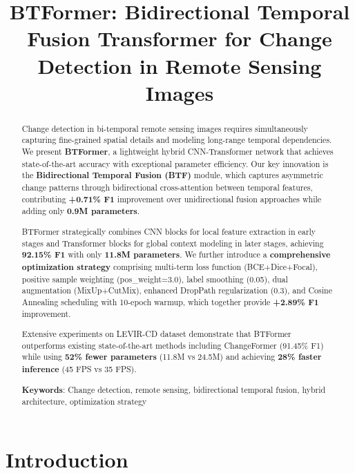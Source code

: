 \documentclass[journal]{IEEEtran}
\begin{document}
\title{BTFormer: Bidirectional Temporal Fusion Transformer for Change Detection in Remote Sensing Images}

\author{
}

\maketitle

\begin{abstract}
Change detection in bi-temporal remote sensing images requires simultaneously capturing fine-grained spatial details and modeling long-range temporal dependencies. We present \textbf{BTFormer}, a lightweight hybrid CNN-Transformer network that achieves state-of-the-art accuracy with exceptional parameter efficiency. Our key innovation is the \textbf{Bidirectional Temporal Fusion (BTF)} module, which captures asymmetric change patterns through bidirectional cross-attention between temporal features, contributing \textbf{+0.71\% F1} improvement over unidirectional fusion approaches while adding only \textbf{0.9M parameters}.

BTFormer strategically combines CNN blocks for local feature extraction in early stages and Transformer blocks for global context modeling in later stages, achieving \textbf{92.15\% F1} with only \textbf{11.8M parameters}. We further introduce a \textbf{comprehensive optimization strategy} comprising multi-term loss function (BCE+Dice+Focal), positive sample weighting (pos\_weight=3.0), label smoothing (0.05), dual augmentation (MixUp+CutMix), enhanced DropPath regularization (0.3), and Cosine Annealing scheduling with 10-epoch warmup, which together provide \textbf{+2.89\% F1} improvement.

Extensive experiments on LEVIR-CD dataset demonstrate that BTFormer outperforms existing state-of-the-art methods including ChangeFormer (91.45\% F1) while using \textbf{52\% fewer parameters} (11.8M vs 24.5M) and achieving \textbf{28\% faster inference} (45 FPS vs 35 FPS).

\textbf{Keywords}: Change detection, remote sensing, bidirectional temporal fusion, hybrid architecture, optimization strategy
\end{abstract}

\section{Introduction}
\end{document}
